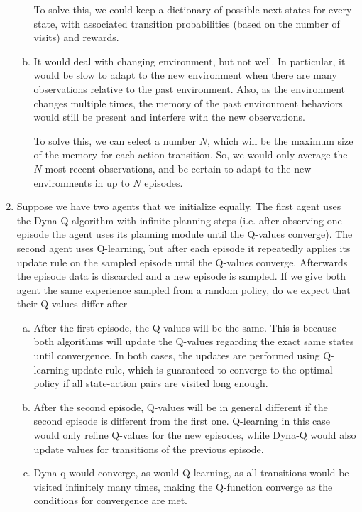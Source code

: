 \documentclass{exam}
\begin{document}
\begin{problem}
\begin{enumerate}
\begin{solutionorlines}[2in]
\begin{enumerate}[(a)]
            To solve this, we could keep a dictionary of possible next states for every state, with associated transition probabilities (based on the number of visits) and rewards.  
            \item
                It would deal with changing environment, but not well. In particular, it would be slow to adapt to the new environment when there are many observations relative to the past environment. Also, as the environment changes multiple times, the memory of the past environment behaviors would still be present and interfere with the new observations.
                
                To solve this, we can select a number $N$, which will be the maximum size of the memory for each action transition. So, we would only average the $N$ most recent observations, and be certain to adapt to the new environments in up to $N$ episodes.
        \end{enumerate}
    \end{solutionorlines}
    \item Suppose we have two agents that we initialize equally. The first agent uses the Dyna-Q algorithm with infinite planning steps (i.e. after observing one episode the agent uses its planning module until the Q-values converge). The second agent uses Q-learning, but after each episode it repeatedly applies its update rule on the sampled episode until the Q-values converge. Afterwards the episode data is discarded and a new episode is sampled. If we give both agent the same experience sampled from a random policy, do we expect that their Q-values differ after
    \begin{solutionorlines}[2in] 
        \begin{enumerate}[(a)]
            \item After the first episode, the Q-values will be the same. This is because both algorithms will update the Q-values regarding the exact same states until convergence. In both cases, the updates are performed using Q-learning update rule, which is guaranteed to converge to the optimal policy if all state-action pairs are visited long enough.
            \item After the second episode, Q-values will be in general different if the second episode is different from the first one. Q-learning in this case would only refine Q-values for the new episodes, while Dyna-Q would also update values for transitions of the previous episode.
            \item Dyna-q would converge, as would Q-learning, as all transitions would be visited infinitely many times, making the Q-function converge as the conditions for convergence are met.
        \end{enumerate}
    \end{solutionorlines}

\end{enumerate}

\end{problem}
\end{document}
